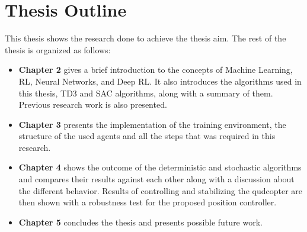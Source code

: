     \section{Thesis Outline}
    This thesis shows the research done to achieve the thesis aim. The rest of the thesis is organized as follows:
    \begin{itemize}
        \item \textbf{Chapter 2} gives a brief introduction to the concepts of Machine Learning, RL, Neural Networks, and Deep RL. It also introduces the algorithms used in this thesis, TD3 and SAC algorithms, along with a summary of them. Previous research work is also presented.
        \item \textbf{Chapter 3} presents the implementation of the training environment, the structure of the used agents and all the steps that was required in this research.
        \item \textbf{Chapter 4} shows the outcome of the deterministic and stochastic algorithms and compares their results against each other along with a discussion about the different behavior. Results of controlling and stabilizing the qudcopter are then shown with a robustness test for the proposed position controller.
        \item \textbf{Chapter 5} concludes the thesis and presents possible future work.
    \end{itemize}

\clearpage